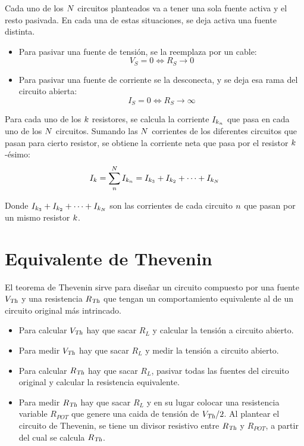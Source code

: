 \documentclass[a5paper,12pt,twoside]{book}
\begin{document}
Cada uno de los $N$ circuitos planteados va a tener una sola fuente activa y el resto pasivada. En cada una de estas situaciones, se deja activa una fuente distinta.

\begin{itemize}
    \item Para pasivar una fuente de tensión, se la reemplaza por un cable:
    \begin{equation*}
        V_S = 0 \iff R_S \to 0
    \end{equation*}

    \item Para pasivar una fuente de corriente se la desconecta, y se deja esa rama del circuito abierta:
    \begin{equation*}
        I_S = 0 \iff R_S \to \infty
    \end{equation*}
\end{itemize}

Para cada uno de los $k$ resistores, se calcula la corriente $I_{k_n}$ que pasa en cada uno de los $N$ circuitos. Sumando las $N$ corrientes de los diferentes circuitos que pasan para cierto resistor, se obtiene la corriente neta que pasa por el resistor $k$-ésimo:
\begin{equation*}
    I_k = \sum_n^N I_{k_n} = I_{k_3} + I_{k_2} + \dots + I_{k_N}
\end{equation*}

Donde $I_{k_3} + I_{k_2} + \dots + I_{k_N}$ son las corrientes de cada circuito $n$ que pasan por un mismo resistor $k$.


\section{Equivalente de Thevenin}

El teorema de Thevenin sirve para diseñar un circuito compuesto por una fuente ${{V}_\textsl{{Th}}}$ y una resistencia ${{R}_\textsl{{Th}}}$ que tengan un comportamiento equivalente al de un circuito original más intrincado.

\begin{itemize}
\item Para calcular ${{V}_\textsl{{Th}}}$ hay que sacar $R_L$ y calcular la tensión a circuito abierto.
\item Para medir ${{V}_\textsl{{Th}}}$ hay que sacar $R_L$ y medir la tensión a circuito abierto.
\item Para calcular ${{R}_\textsl{{Th}}}$ hay que sacar $R_L$, pasivar todas las fuentes del circuito original y calcular la resistencia equivalente.
\item Para medir ${{R}_\textsl{{Th}}}$ hay que sacar $R_L$ y en su lugar colocar una resistencia variable $R_{POT}$ que genere una caida de tensión de ${{V}_\textsl{{Th}}}/2$. Al plantear el circuito de Thevenin, se tiene un divisor resistivo entre ${{R}_\textsl{{Th}}}$ y $R_{POT}$, a partir del cual se calcula ${{R}_\textsl{{Th}}}$.
\end{itemize}
\end{document}

